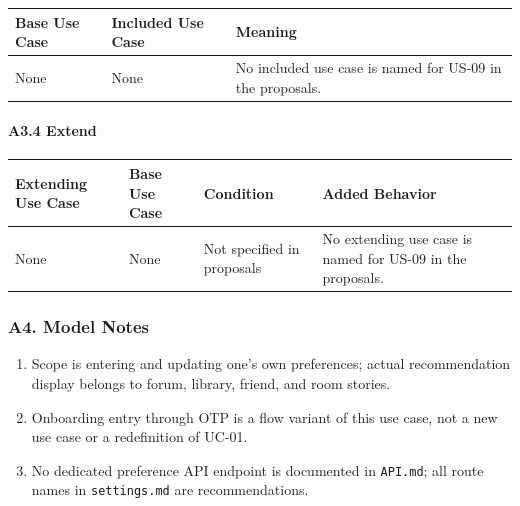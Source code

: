 \documentclass[12pt]{article}
\renewcommand{\baselinestretch}{1.5}
\begin{document}
\begingroup
\small
\renewcommand{\baselinestretch}{1.0}\selectfont
\renewcommand{\arraystretch}{1.15}
\setlength{\tabcolsep}{6pt}
\begin{longtable}{|>{\raggedright\arraybackslash}p{}|>{\raggedright\arraybackslash}p{}|>{\raggedright\arraybackslash}p{}|}
\hline
\textbf{Base Use Case} & \textbf{Included Use Case} & \textbf{Meaning} \\ \hline
\endhead
None & None & No included use case is named for US-09 in the proposals. \\ \hline
\end{longtable}
\endgroup
\par\medskip

\hypertarget{sec:a3-4-extend}{}
\paragraph*{A3.4 Extend}
\par\medskip

\begingroup
\small
\renewcommand{\baselinestretch}{1.0}\selectfont
\renewcommand{\arraystretch}{1.15}
\setlength{\tabcolsep}{6pt}
\begin{longtable}{|>{\raggedright\arraybackslash}p{}|>{\raggedright\arraybackslash}p{}|>{\raggedright\arraybackslash}p{}|>{\raggedright\arraybackslash}p{}|}
\hline
\textbf{Extending Use Case} & \textbf{Base Use Case} & \textbf{Condition} & \textbf{Added Behavior} \\ \hline
\endhead
None & None & Not specified in proposals & No extending use case is named for US-09 in the proposals. \\ \hline
\end{longtable}
\endgroup
\par\medskip

\hypertarget{sec:a4-model-notes}{}
\subsubsection*{A4. Model Notes}
\par\medskip

\begin{enumerate}
\item Scope is entering and updating one's own preferences; actual recommendation display belongs to forum, library, friend, and room stories.
\item Onboarding entry through OTP is a flow variant of this use case, not a new use case or a redefinition of UC-01.
\item No dedicated preference API endpoint is documented in \texttt{API.md}; all route names in \texttt{settings.md} are recommendations.
\end{enumerate}
\par\medskip
\end{document}
